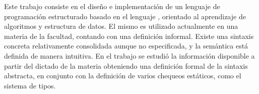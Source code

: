 Este trabajo consiste en el diseño e implementación de un lenguaje de programación estructurado basado en el lenguaje \Pascal{}, orientado al aprendizaje de algoritmos y estructura de datos.
El mismo es utilizado actualmente en una materia de la facultad, contando con una definición informal.
Existe una sintaxis concreta relativamente consolidada aunque no especificada, y la semántica está definida de manera intuitiva.
En el trabajo se estudió la información disponible a partir del dictado de la materia obteniendo una definición formal de la sintaxis abstracta, en conjunto con la definición de varios chequeos estáticos, como el sistema de tipos.
